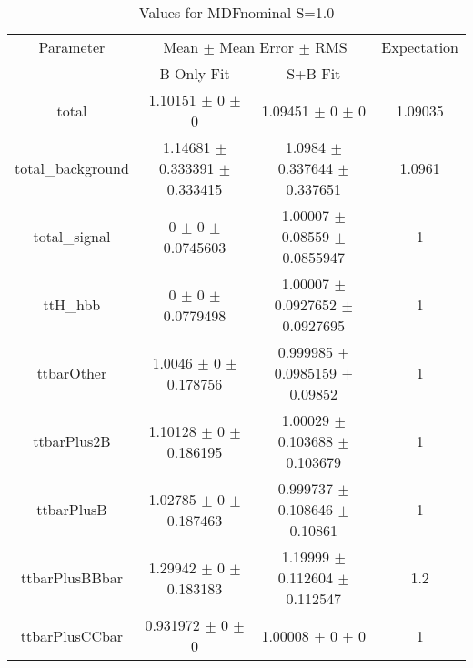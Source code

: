 \begin{table}
\centering
\caption{Values for MDFnominal S=1.0}
\begin{tabular}{cccc}
\toprule
Parameter & \multicolumn{2}{c}{Mean $\pm$ Mean Error $\pm$ RMS} & Expectation\\
 & B-Only Fit & S+B Fit & \\
\midrule
total & \num{1.10151} $\pm$ \num{0} $\pm$ \num{0} & \num{1.09451} $\pm$ \num{0} $\pm$ \num{0} & \num{1.09035}\\
total\_background & \num{1.14681} $\pm$ \num{0.333391} $\pm$ \num{0.333415} & \num{1.0984} $\pm$ \num{0.337644} $\pm$ \num{0.337651} & \num{1.0961}\\
total\_signal & \num{0} $\pm$ \num{0} $\pm$ \num{0.0745603} & \num{1.00007} $\pm$ \num{0.08559} $\pm$ \num{0.0855947} & \num{1}\\
ttH\_hbb & \num{0} $\pm$ \num{0} $\pm$ \num{0.0779498} & \num{1.00007} $\pm$ \num{0.0927652} $\pm$ \num{0.0927695} & \num{1}\\
ttbarOther & \num{1.0046} $\pm$ \num{0} $\pm$ \num{0.178756} & \num{0.999985} $\pm$ \num{0.0985159} $\pm$ \num{0.09852} & \num{1}\\
ttbarPlus2B & \num{1.10128} $\pm$ \num{0} $\pm$ \num{0.186195} & \num{1.00029} $\pm$ \num{0.103688} $\pm$ \num{0.103679} & \num{1}\\
ttbarPlusB & \num{1.02785} $\pm$ \num{0} $\pm$ \num{0.187463} & \num{0.999737} $\pm$ \num{0.108646} $\pm$ \num{0.10861} & \num{1}\\
ttbarPlusBBbar & \num{1.29942} $\pm$ \num{0} $\pm$ \num{0.183183} & \num{1.19999} $\pm$ \num{0.112604} $\pm$ \num{0.112547} & \num{1.2}\\
ttbarPlusCCbar & \num{0.931972} $\pm$ \num{0} $\pm$ \num{0} & \num{1.00008} $\pm$ \num{0} $\pm$ \num{0} & \num{1}\\
\bottomrule
\end{tabular}
\end{table}